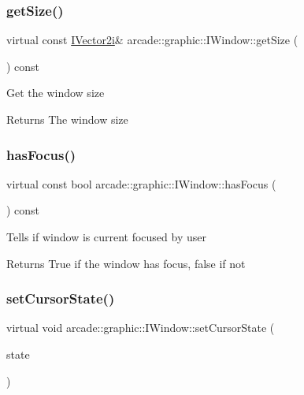 \subsubsection{\texorpdfstring{getSize()}{getSize()}}
{\footnotesize\ttfamily virtual const \mbox{\hyperlink{classarcade_1_1graphic_1_1_i_vector2i}{I\+Vector2i}}\& arcade\+::graphic\+::\+I\+Window\+::get\+Size (\begin{DoxyParamCaption}{ }\end{DoxyParamCaption}) const\hspace{0.3cm}{\ttfamily [pure virtual]}}

Get the window size \begin{DoxyReturn}{Returns}
The window size 
\end{DoxyReturn}
\mbox{\label{classarcade_1_1graphic_1_1_i_window_a84eaf98ba609609b445b80618f37b8eb}} 
\subsubsection{\texorpdfstring{hasFocus()}{hasFocus()}}
{\footnotesize\ttfamily virtual const bool arcade\+::graphic\+::\+I\+Window\+::has\+Focus (\begin{DoxyParamCaption}{ }\end{DoxyParamCaption}) const\hspace{0.3cm}{\ttfamily [pure virtual]}}

Tells if window is current focused by user \begin{DoxyReturn}{Returns}
True if the window has focus, false if not 
\end{DoxyReturn}
\mbox{\label{classarcade_1_1graphic_1_1_i_window_a3191f74f851804b1007f008276ba38b9}} 
\subsubsection{\texorpdfstring{setCursorState()}{setCursorState()}}
{\footnotesize\ttfamily virtual void arcade\+::graphic\+::\+I\+Window\+::set\+Cursor\+State (\begin{DoxyParamCaption}\item[{\mbox{\hyperlink{classarcade_1_1graphic_1_1_i_window_aa88d1788d30d459f166dd29dbe5b5f7f}{Cursor\+State}}}]{state }\end{DoxyParamCaption})\hspace{0.3cm}{\ttfamily [pure virtual]}}

